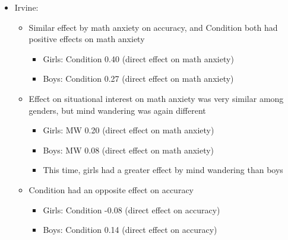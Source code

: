 \documentclass[
  letterpaper,
  DIV=11,
  numbers=noendperiod]{scrartcl}
\begin{document}
\begin{itemize}
\item
  Irvine:

  \begin{itemize}
  \item
    Similar effect by math anxiety on accuracy, and Condition both had
    positive effects on math anxiety

    \begin{itemize}
    \item
      Girls: Condition 0.40 (direct effect on math anxiety)
    \item
      Boys: Condition 0.27 (direct effect on math anxiety)
    \end{itemize}
  \item
    Effect on situational interest on math anxiety was very similar
    among genders, but mind wandering was again different

    \begin{itemize}
    \item
      Girls: MW 0.20 (direct effect on math anxiety)
    \item
      Boys: MW 0.08 (direct effect on math anxiety)
    \item
      This time, girls had a greater effect by mind wandering than boys
    \end{itemize}
  \item
    Condition had an opposite effect on accuracy

    \begin{itemize}
    \item
      Girls: Condition -0.08 (direct effect on accuracy)
    \item
      Boys: Condition 0.14 (direct effect on accuracy)
    \end{itemize}
  \end{itemize}
\end{itemize}
\end{document}
